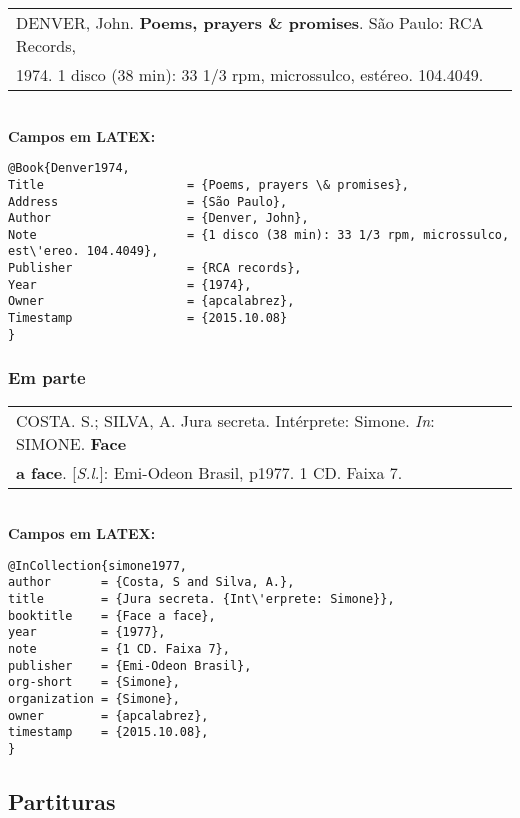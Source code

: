 \begin{tabular}{|l|c|} \hline
	DENVER, John. \textbf{Poems, prayers \& promises}. São Paulo: RCA Records,\\
	1974. 1 disco (38 min): 33 1/3 rpm, microssulco, est\'ereo. 104.4049. \\\hline
\end{tabular} \\

\textbf{Campos em LATEX:} 

\begin{verbatim}
@Book{Denver1974,
Title                    = {Poems, prayers \& promises},
Address                  = {São Paulo},
Author                   = {Denver, John},
Note                     = {1 disco (38 min): 33 1/3 rpm, microssulco, 
est\'ereo. 104.4049},
Publisher                = {RCA records},
Year                     = {1974},
Owner                    = {apcalabrez},
Timestamp                = {2015.10.08}
}
\end{verbatim}

\subsubsection{Em parte}

\begin{tabular}{|l|c|} \hline
	COSTA. S.; SILVA, A. Jura secreta. Int\'erprete: Simone. \textit{In}: SIMONE. \textbf{Face}\\ \textbf{a face}. [\textit{S.l.}]: Emi-Odeon Brasil, p1977. 1 CD. Faixa 7. 
	\\\hline
\end{tabular} \\

\textbf{Campos em LATEX:} 

\begin{verbatim}
@InCollection{simone1977,
author       = {Costa, S and Silva, A.},
title        = {Jura secreta. {Int\'erprete: Simone}},
booktitle    = {Face a face},
year         = {1977},
note         = {1 CD. Faixa 7},
publisher    = {Emi-Odeon Brasil},
org-short    = {Simone},
organization = {Simone},
owner        = {apcalabrez},
timestamp    = {2015.10.08},
}
\end{verbatim}

\subsection{Partituras}

